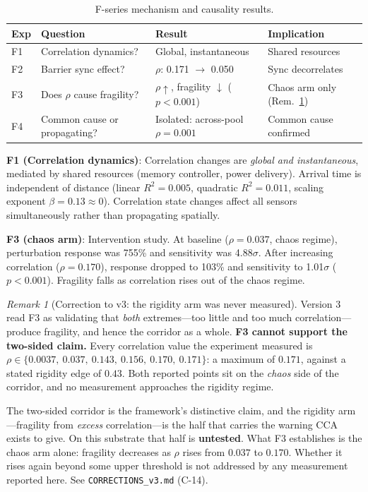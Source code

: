 \documentclass[11pt,a4paper]{article}
\theoremstyle{definition}
\theoremstyle{remark}
\newtheorem{remark}{Remark}[section]
\begin{document}
\begin{table}[H]
\centering
\small
\begin{tabular}{>{\raggedright}p{} >{\raggedright}p{} >{\raggedright}p{} >{\raggedright\arraybackslash}p{}}
\toprule
\textbf{Exp} & \textbf{Question} & \textbf{Result} & \textbf{Implication} \\
\midrule
F1 & Correlation dynamics? & Global, instantaneous & Shared resources \\
F2 & Barrier sync effect? & $\rho$: 0.171 $\to$ 0.050 & Sync decorrelates \\
F3 & Does $\rho$ cause fragility? & $\rho \uparrow$, fragility $\downarrow$ ($p < 0.001$) & Chaos arm only (Rem.~\ref{rem:corridor-arm}) \\
F4 & Common cause or propagating? & Isolated: across-pool $\rho = 0.001$ & Common cause confirmed \\
\bottomrule
\end{tabular}
\caption{F-series mechanism and causality results.}
\end{table}

\textbf{F1 (Correlation dynamics)}: Correlation changes are \textit{global and instantaneous}, mediated by shared resources (memory controller, power delivery). Arrival time is independent of distance (linear $R^2 = 0.005$, quadratic $R^2 = 0.011$, scaling exponent $\beta = 0.13 \approx 0$). Correlation state changes affect all sensors simultaneously rather than propagating spatially.

\textbf{F3 (chaos arm)}: Intervention study. At baseline ($\rho = 0.037$, chaos regime), perturbation response was 755\% and sensitivity was 4.88$\sigma$. After increasing correlation ($\rho = 0.170$), response dropped to 103\% and sensitivity to 1.01$\sigma$ ($p < 0.001$). Fragility falls as correlation rises out of the chaos regime.

\begin{remark}[Correction to v3: the rigidity arm was never measured]
\label{rem:corridor-arm}
Version 3 read F3 as validating that \emph{both} extremes---too little and too much correlation---produce fragility, and hence the corridor as a whole. \textbf{F3 cannot support the two-sided claim.} Every correlation value the experiment measured is $\rho \in \{0.0037,\ 0.037,\ 0.143,\ 0.156,\ 0.170,\ 0.171\}$: a maximum of $0.171$, against a stated rigidity edge of $0.43$. Both reported points sit on the \emph{chaos} side of the corridor, and no measurement approaches the rigidity regime.

The two-sided corridor is the framework's distinctive claim, and the rigidity arm---fragility from \emph{excess} correlation---is the half that carries the warning CCA exists to give. On this substrate that half is \textbf{untested}. What F3 establishes is the chaos arm alone: fragility decreases as $\rho$ rises from $0.037$ to $0.170$. Whether it rises again beyond some upper threshold is not addressed by any measurement reported here. See \texttt{CORRECTIONS\_v3.md} (C-14).
\end{remark}
\end{document}
